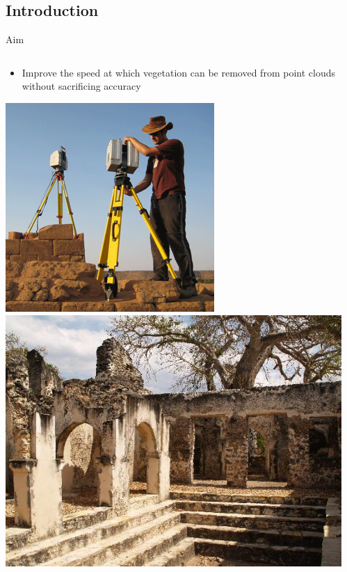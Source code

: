 \documentclass[compress]{beamer}
\begin{document}
\subsection*{Introduction}
\begin{frame}{Aim}

\begin{columns}[T]
\begin{column}{1.0\textwidth}

\begin{itemize}
\item  Improve the speed at which vegetation can be removed from point clouds without sacrificing accuracy
\end{itemize}

\centering
\includegraphics[height=0.5\textheight]{pics/zamani4}
\includegraphics[height=0.5\textheight]{pics/zamani3}

\end{column}
\begin{column}{0.0\textwidth}

\end{column}
\end{columns}


\end{frame}
\end{document}
